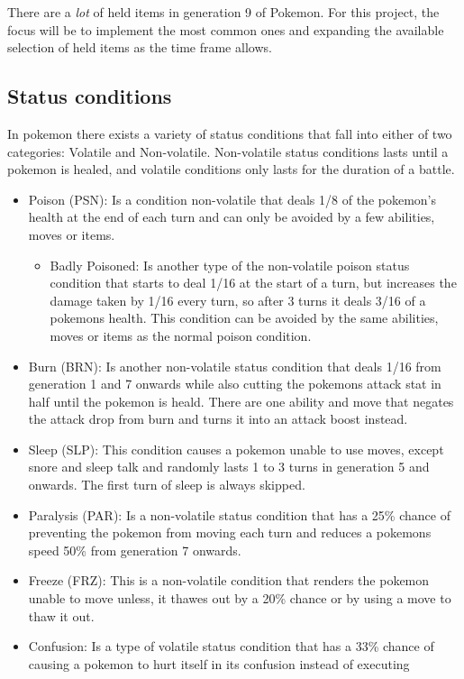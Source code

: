 There are a \textit{lot} of held items in generation 9 of Pokemon. For this project, the focus will be to implement the most common ones and expanding the available selection of held items as the time frame allows. 

\subsection{Status conditions}
In pokemon there exists a variety of status conditions that fall into either of two categories: Volatile and Non-volatile. Non-volatile status conditions
lasts until a pokemon is healed, and volatile conditions only lasts for the duration of a battle. \cite{StatusCondition}
\begin{itemize}
  \item Poison (PSN): Is a condition non-volatile that deals 1/8 of the pokemon's health at the end of each turn and can only be avoided by a few abilities,
  moves or items.
  \begin{itemize}
    \item Badly Poisoned: Is another type of the non-volatile poison status condition that starts to deal 1/16 at the start of a turn, 
      but increases the damage taken by 1/16 every turn, so after 3 turns it deals 3/16 of a pokemons health. 
      This condition can be avoided by the same abilities, moves or items as the normal poison condition.
  \end{itemize}
  \item Burn (BRN): Is another non-volatile status condition that deals 1/16 from generation 1 and 7 onwards while also cutting the pokemons attack stat
    in half until the pokemon is heald. There are one ability and move that negates the attack drop from burn and turns it into an attack boost instead.
  \item Sleep (SLP): This condition causes a pokemon unable to use moves, except snore and sleep talk and 
    randomly lasts 1 to 3 turns in generation 5 and onwards. The first turn of sleep is always skipped.
  \item Paralysis (PAR): Is a non-volatile status condition that has a 25\% chance of preventing the pokemon from moving each turn and reduces a pokemons
    speed 50\% from generation 7 onwards.
  \item Freeze (FRZ): This is a non-volatile condition that renders the pokemon unable to move unless, it thawes out by a 20\% chance or 
    by using a move to thaw it out.
  \item Confusion: Is a type of volatile status condition that has a 33\% chance of causing a pokemon to hurt itself in its confusion instead of executing

\end{itemize}
